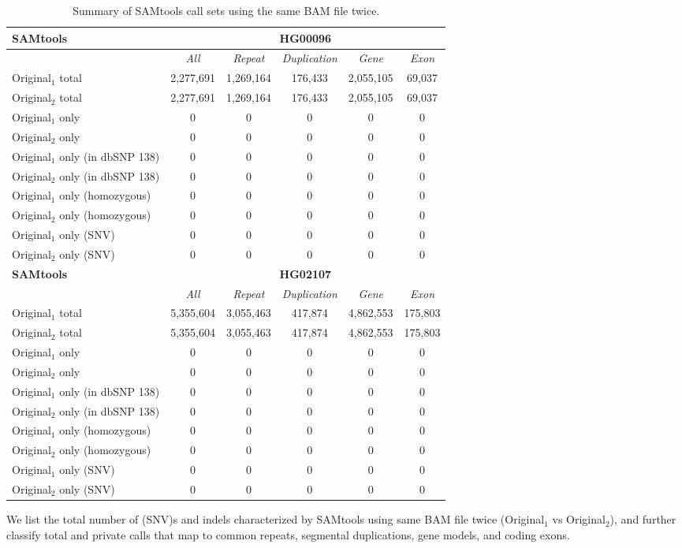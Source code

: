\begin{table}[htb]
\caption{ Summary of SAMtools call sets using the same BAM file twice. }
\begin{center}
\begin{tabular}{|l|c||c|c|c|c|}
\hline
{\bf SAMtools} & \multicolumn{5}{|c|}{\bf HG00096} \\
\hline
\cline{2-6}
{\bf} & {\it All} & {\it Repeat} & {\it Duplication} & {\it Gene} & {\it Exon} \\
\hline
Original$_1$ total & 2,277,691 & 1,269,164 & 176,433 & 2,055,105 & 69,037 \\
\hline
Original$_2$ total & 2,277,691 & 1,269,164 & 176,433 & 2,055,105 & 69,037 \\
\hline
Original$_1$ only & 0 & 0 & 0 & 0 & 0\\ 
\hline
Original$_2$ only & 0 & 0 & 0 & 0 & 0\\ 
\hline
Original$_1$ only (in dbSNP 138) & 0 & 0 & 0 & 0 & 0\\ 
\hline
Original$_2$ only (in dbSNP 138) & 0 & 0 & 0 & 0 & 0\\ 
\hline
Original$_1$ only (homozygous) & 0 & 0 & 0 & 0 & 0\\ 
\hline
Original$_2$ only (homozygous) & 0 & 0 & 0 & 0 & 0\\ 
\hline
Original$_1$ only (SNV) & 0 & 0 & 0 & 0 & 0\\ 
\hline
Original$_2$ only (SNV) & 0 & 0 & 0 & 0 & 0\\ 
\hline
\hline
{\bf SAMtools} & \multicolumn{5}{|c|}{\bf HG02107} \\
\hline
\cline{2-6}
{\bf} & {\it All} & {\it Repeat} & {\it Duplication} & {\it Gene} & {\it Exon} \\
\hline
Original$_1$ total & 5,355,604 & 3,055,463 & 417,874 & 4,862,553 & 175,803 \\
\hline
Original$_2$ total & 5,355,604 & 3,055,463 & 417,874 & 4,862,553 & 175,803 \\
\hline
Original$_1$ only & 0 & 0 & 0 & 0 & 0\\ 
\hline
Original$_2$ only & 0 & 0 & 0 & 0 & 0\\ 
\hline
Original$_1$ only (in dbSNP 138) & 0 & 0 & 0 & 0 & 0\\ 
\hline
Original$_2$ only (in dbSNP 138) & 0 & 0 & 0 & 0 & 0\\ 
\hline
Original$_1$ only (homozygous) & 0 & 0 & 0 & 0 & 0\\ 
\hline
Original$_2$ only (homozygous) & 0 & 0 & 0 & 0 & 0\\ 
\hline
Original$_1$ only (SNV) & 0 & 0 & 0 & 0 & 0\\ 
\hline
Original$_2$ only (SNV) & 0 & 0 & 0 & 0 & 0\\ 
\hline
\end{tabular}
\end{center}
{\footnotesize We list the total number of (SNV)s and indels characterized by SAMtools using same BAM file twice (Original$_1$ vs Original$_2$), 
and further classify total and private calls that map to common repeats, segmental duplications, gene models, and coding exons.}
\label{supptab:orig-vs-orig2-samtools}
\end{table}

